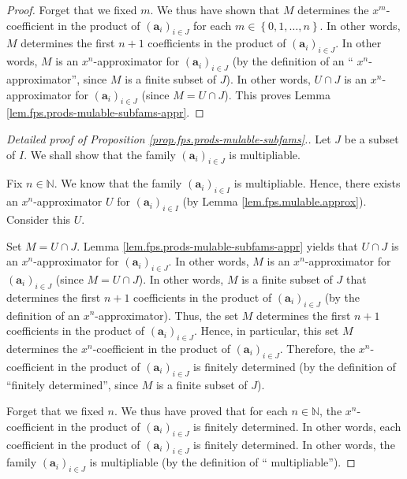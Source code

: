 \begin{fineprint}
\begin{proof}
Forget that we fixed $m$. We thus have shown that $M$ determines the $x^{m}%
$-coefficient in the product of $\left(  \mathbf{a}_{i}\right)  _{i\in J}$ for
each $m\in\left\{  0,1,\ldots,n\right\}  $. In other words, $M$ determines the
first $n+1$ coefficients in the product of $\left(  \mathbf{a}_{i}\right)
_{i\in J}$. In other words, $M$ is an $x^{n}$-approximator for $\left(
\mathbf{a}_{i}\right)  _{i\in J}$ (by the definition of an \textquotedblleft%
$x^{n}$-approximator\textquotedblright, since $M$ is a finite subset of $J$).
In other words, $U\cap J$ is an $x^{n}$-approximator for $\left(
\mathbf{a}_{i}\right)  _{i\in J}$ (since $M=U\cap J$). This proves Lemma
\ref{lem.fps.prods-mulable-subfams-appr}.
\end{proof}
\end{fineprint}

\begin{fineprint}
\begin{proof}
[Detailed proof of Proposition \ref{prop.fps.prods-mulable-subfams}.]Let $J$
be a subset of $I$. We shall show that the family $\left(  \mathbf{a}%
_{i}\right)  _{i\in J}$ is multipliable.

Fix $n\in\mathbb{N}$. We know that the family $\left(  \mathbf{a}_{i}\right)
_{i\in I}$ is multipliable. Hence, there exists an $x^{n}$-approximator $U$
for $\left(  \mathbf{a}_{i}\right)  _{i\in I}$ (by Lemma
\ref{lem.fps.mulable.approx}). Consider this $U$.

Set $M=U\cap J$. Lemma \ref{lem.fps.prods-mulable-subfams-appr} yields that
$U\cap J$ is an $x^{n}$-approximator for $\left(  \mathbf{a}_{i}\right)
_{i\in J}$. In other words, $M$ is an $x^{n}$-approximator for $\left(
\mathbf{a}_{i}\right)  _{i\in J}$ (since $M=U\cap J$). In other words, $M$ is
a finite subset of $J$ that determines the first $n+1$ coefficients in the
product of $\left(  \mathbf{a}_{i}\right)  _{i\in J}$ (by the definition of an
$x^{n}$-approximator). Thus, the set $M$ determines the first $n+1$
coefficients in the product of $\left(  \mathbf{a}_{i}\right)  _{i\in J}$.
Hence, in particular, this set $M$ determines the $x^{n}$-coefficient in the
product of $\left(  \mathbf{a}_{i}\right)  _{i\in J}$. Therefore, the $x^{n}%
$-coefficient in the product of $\left(  \mathbf{a}_{i}\right)  _{i\in J}$ is
finitely determined (by the definition of \textquotedblleft finitely
determined\textquotedblright, since $M$ is a finite subset of $J$).

Forget that we fixed $n$. We thus have proved that for each $n\in\mathbb{N}$,
the $x^{n}$-coefficient in the product of $\left(  \mathbf{a}_{i}\right)
_{i\in J}$ is finitely determined. In other words, each coefficient in the
product of $\left(  \mathbf{a}_{i}\right)  _{i\in J}$ is finitely determined.
In other words, the family $\left(  \mathbf{a}_{i}\right)  _{i\in J}$ is
multipliable (by the definition of \textquotedblleft
multipliable\textquotedblright).


\end{proof}
\end{fineprint}

